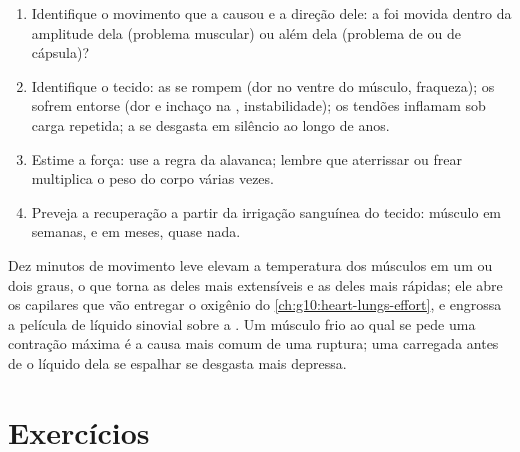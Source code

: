 \begin{method}\label{met:g10:muscles-and-joints:analyse}
\begin{enumerate}
  \item Identifique o movimento que a causou e a direção dele: a
         foi movida dentro da amplitude dela (problema
        muscular) ou além dela (problema de  ou de cápsula)?
  \item Identifique o tecido: as  se rompem (dor no
        ventre do músculo, fraqueza); os  sofrem entorse
        (dor e inchaço na , instabilidade); os tendões
        inflamam sob carga repetida; a  se desgasta em
        silêncio ao longo de anos.
  \item Estime a força: use a regra da alavanca; lembre que aterrissar
        ou frear multiplica o peso do corpo várias vezes.
  \item Preveja a recuperação a partir da irrigação sanguínea do
        tecido: músculo em semanas,  e  em meses,
         quase nada.
\end{enumerate}
\end{method}

\begin{remark}\label{rem:g10:muscles-and-joints:warmup}
Dez minutos de movimento leve elevam a temperatura dos músculos em um
ou dois graus, o que torna as  deles mais extensíveis e as
 deles mais rápidas; ele abre os capilares que vão entregar o
oxigênio do \cref{ch:g10:heart-lungs-effort}, e engrossa a película de
líquido sinovial sobre a . Um músculo frio ao qual se pede
uma contração máxima é a causa mais comum de uma ruptura; uma
 carregada antes de o líquido dela se espalhar se desgasta
mais depressa.
\end{remark}

\section{Exercícios}


